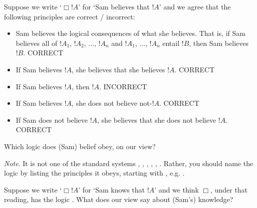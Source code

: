 \documentclass[../../../../include/open-logic-section]{subfiles}
\begin{document}


\begin{prob}
Suppose we write `$\Box !A$' for `Sam believes that $ !A$' and
we agree that the following principles are correct / incorrect:

\begin{itemize}
\item Sam believes the logical consequences of what she believes. That is,
if Sam believes all of $ !A_{1}$, $ !A_{2}$, $\ldots$, $ !A_{n}$
and $ !A_{1}$, $\ldots$, $ !A_{n}$ entail $!B$, then Sam believes
$!B$. CORRECT
\item If Sam believes $!A$, she believes that she believes $!A$. CORRECT
\item If Sam believes $!A$, then $!A$. INCORRECT 
\item If Sam believes $!A$, she does not believe not-$!A$. CORRECT
\item If Sam does not believe $!A$, she believes that she does not believe
$ !A$. CORRECT
\end{itemize}
Which logic does (Sam) belief obey, on our view?

\emph{Note}. It is not one of the standard systems , ,
, , , . Rather,
you should name the logic by listing the principles it obeys,
starting with , e.g. .
\end{prob}

\begin{prob}
Suppose we write `$\Box !A$' for `Sam knows that $ !A$' and we
think $\Box$, under that reading, has the logic . What
does our view say about (Sam's) knowledge? 
\end{prob}
\end{document}
